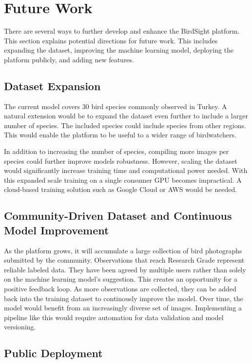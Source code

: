\section{Future Work}

There are several ways to further develop and enhance the BirdSight platform. This section explains potential directions for future work.
This includes expanding the dataset, improving the machine learning model, deploying the platform publicly, and adding new features.

\subsection{Dataset Expansion}

The current model covers 30 bird species commonly observed in Turkey. A natural extension would be to expand the dataset even further to include 
a larger number of species. The included species could include species from other regions. This would enable the platform to be useful to a wider range of birdwatchers. 

In addition to increasing the number of species, compiling more images per species could further improve models robustness. However, scaling the dataset would significantly
 increase training time and computational power needed. With this expanded scale training on a single consumer GPU becomes impractical. A cloud-based training solution such as 
 Google Cloud or AWS would be needed.

\subsection{Community-Driven Dataset and Continuous Model Improvement}

As the platform grows, it will accumulate a large collection of bird photographs submitted by the community. Observations that reach Research Grade represent reliable labeled data. They have been agreed by multiple users rather than solely on the machine learning model's suggestion.
This creates an opportunity for a positive feedback loop. As more observations are collected, they can be added back into the training dataset to continously improve the model. Over time, the model would benefit from an increasingly diverse set of images. 
Implementing a pipeline like this would require automation for data validation and model versioning.

\subsection{Public Deployment}


